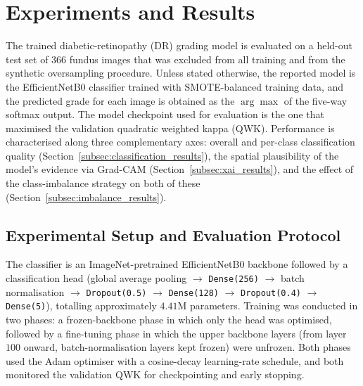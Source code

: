 \section{Experiments and Results}
\label{sec:results}


The trained diabetic-retinopathy (DR) grading model is evaluated on a held-out
test set of $366$ fundus images that was excluded from all training and from the
synthetic oversampling procedure. Unless stated otherwise, the reported model is
the EfficientNetB0 classifier trained with SMOTE-balanced training data, and the
predicted grade for each image is obtained as the $\arg\max$ of the five-way
softmax output. The model checkpoint used for evaluation is the one that
maximised the validation quadratic weighted kappa (QWK). Performance is
characterised along three complementary axes: overall and per-class
classification quality (Section~\ref{subsec:classification_results}), the spatial
plausibility of the model's evidence via Grad-CAM
(Section~\ref{subsec:xai_results}), and the effect of the class-imbalance
strategy on both of these (Section~\ref{subsec:imbalance_results}).

\subsection{Experimental Setup and Evaluation Protocol}
\label{subsec:eval_protocol}

The classifier is an ImageNet-pretrained EfficientNetB0 backbone followed by a
classification head (global average pooling $\rightarrow$
\texttt{Dense(256)} $\rightarrow$ batch normalisation $\rightarrow$
\texttt{Dropout(0.5)} $\rightarrow$ \texttt{Dense(128)} $\rightarrow$
\texttt{Dropout(0.4)} $\rightarrow$ \texttt{Dense(5)}), totalling approximately
$4.41$M parameters. Training was conducted in two phases: a frozen-backbone phase
in which only the head was optimised, followed by a fine-tuning phase in which the
upper backbone layers (from layer $100$ onward, batch-normalisation layers kept
frozen) were unfrozen. Both phases used the Adam optimiser with a cosine-decay
learning-rate schedule, and both monitored the validation QWK for checkpointing
and early stopping.

